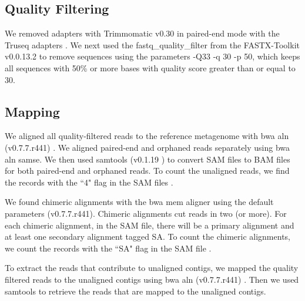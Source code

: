 \subsection*{Quality Filtering} 

We removed adapters with Trimmomatic v0.30 in paired-end mode with the
Truseq adapters \cite{trim}.
We next used the fastq\_quality\_filter %
from the FASTX-Toolkit v0.0.13.2 \cite{FXtoolkit} to remove sequences  %
using the parameters -Q33 -q 30 -p 50, which keeps all sequences with 50\% or more bases with quality score greater than or equal to 30. %


\subsection*{Mapping}

We aligned all quality-filtered reads to the reference metagenome with bwa
aln (v0.7.7.r441) \cite{bwa}. %
  We aligned paired-end and orphaned reads separately using bwa aln samse.
We then used
 samtools (v0.1.19 ) \cite{sam-stools} to convert SAM files to BAM files for both
paired-end and orphaned reads. To count the unaligned reads, we find the records with the ``4" flag in the SAM files \cite{sam-stools}. 

We found chimeric alignments with the bwa mem aligner using the
default parameters (v0.7.7.r441).  Chimeric alignments cut reads in
two (or more).  For each chimeric alignment, in the SAM file, there
will be a primary alignment and at least one secondary alignment
tagged SA.  To count the chimeric alignments, we count the records
with the ``SA" flag in the SAM file \cite{sam-stools}. 

To extract the reads that contribute to unaligned contigs, we mapped the quality filtered reads to the unaligned contigs using bwa aln (v0.7.7.r441) \cite{bwa}. 
Then we used samtools \cite{sam-stools} to retrieve the reads that are mapped to the unaligned contigs. 

